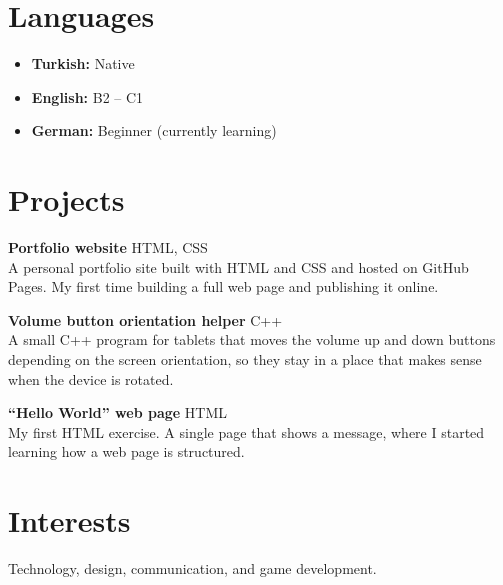 \documentclass[11pt,a4paper]{article}
\begin{document}
\section{Languages}
\begin{itemize}[leftmargin=1.2em, itemsep=2pt, topsep=2pt]
  \item \textbf{Turkish:} Native
  \item \textbf{English:} B2 -- C1
  \item \textbf{German:} Beginner (currently learning)
\end{itemize}

\section{Projects}

\noindent\textbf{Portfolio website} \hfill \textcolor{soft}{HTML, CSS}\\
A personal portfolio site built with HTML and CSS and hosted on GitHub Pages. My first time
building a full web page and publishing it online.

\vspace{6pt}

\noindent\textbf{Volume button orientation helper} \hfill \textcolor{soft}{C++}\\
A small C++ program for tablets that moves the volume up and down buttons depending on the
screen orientation, so they stay in a place that makes sense when the device is rotated.

\vspace{6pt}

\noindent\textbf{``Hello World'' web page} \hfill \textcolor{soft}{HTML}\\
My first HTML exercise. A single page that shows a message, where I started learning how a
web page is structured.

\section{Interests}
Technology, design, communication, and game development.
\end{document}
